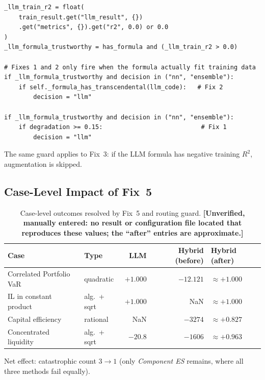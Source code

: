 \documentclass[twoside,11pt]{article}
\begin{document}
\begin{lstlisting}[caption={LLM-formula trustworthiness guard.}]
_llm_train_r2 = float(
    train_result.get("llm_result", {})
    .get("metrics", {}).get("r2", 0.0) or 0.0
)
_llm_formula_trustworthy = has_formula and (_llm_train_r2 > 0.0)

# Fixes 1 and 2 only fire when the formula actually fit training data
if _llm_formula_trustworthy and decision in ("nn", "ensemble"):
    if self._formula_has_transcendental(llm_code):   # Fix 2
        decision = "llm"

if _llm_formula_trustworthy and decision in ("nn", "ensemble"):
    if degradation >= 0.15:                           # Fix 1
        decision = "llm"
\end{lstlisting}

The same guard applies to Fix~3: if the LLM formula has negative training
$R^2$, augmentation is skipped.

\subsection{Case-Level Impact of Fix~5}

\begin{table}[h]
\centering
\caption{Case-level outcomes resolved by Fix~5 and routing guard.
  \textbf{[Unverified, manually entered: no result or configuration file located
  that reproduces these values; the ``after'' entries are approximate.]}}
\label{tab:fix5_cases}
\begin{tabular}{llrrl}
\toprule
\textbf{Case} & \textbf{Type} & \textbf{LLM} & \textbf{Hybrid (before)} & \textbf{Hybrid (after)} \\
\midrule
Correlated Portfolio VaR & quadratic     & $+1.000$ & $-12.121$ & $\approx+1.000$ \\
IL in constant product   & alg.\ + sqrt  & $+1.000$ & NaN       & $\approx+1.000$ \\
Capital efficiency       & rational      & NaN      & $-3274$   & $\approx+0.827$ \\
Concentrated liquidity   & alg.\ + sqrt  & $-20.8$  & $-1606$   & $\approx+0.963$ \\
\bottomrule
\end{tabular}
\end{table}

Net effect: catastrophic count $3 \to 1$ (only \emph{Component ES} remains,
where all three methods fail equally).

\end{document}
